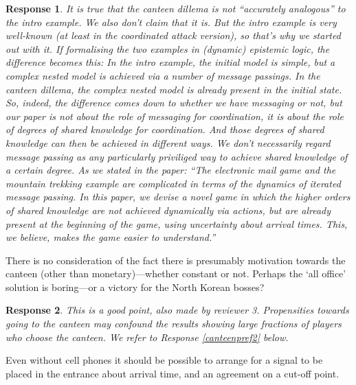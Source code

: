 \documentclass[a4paper]{article}
\newtheorem{response}{Response}
\begin{document}
\begin{response}

It is true that the canteen dillema is not ``accurately analogous'' to the intro example. We also don't claim that it is. But the intro example is very well-known (at least in the coordinated attack version), so that's why we started out with it. If formalising the two examples in (dynamic) epistemic logic, the difference becomes this: In the intro example, the initial model is simple, but a complex nested model is achieved via a number of message passings. In the canteen dillema, the complex nested model is already present in the initial state. So, indeed, the difference comes down to whether we have messaging or not, but our paper is not about the role of messaging for coordination, it is about the role of degrees of shared knowledge for coordination. And those degrees of shared knowledge can then be achieved in different ways. We don't necessarily regard message passing as any particularly priviliged way to achieve shared knowledge of a certain degree. As we stated in the paper: ``The electronic mail game and the mountain trekking example are complicated in terms of the dynamics of iterated message passing. In this paper, we devise a novel game in which the higher orders of shared knowledge are not achieved dynamically via actions, but are already present at the beginning of the game, using uncertainty about arrival times. This, we believe, makes the game easier to understand.'' 
\end{response}


There is no consideration of the fact there is presumably motivation towards the canteen (other than monetary)—whether constant or not. Perhaps the `all office' solution is boring—or a victory for the North Korean bosses? 

\begin{response} 
This is a good point, also made by reviewer 3. Propensities towards going to the canteen may confound the results showing large fractions of players who choose the canteen. We refer to Response \ref{canteenpref2} below.
\end{response}

Even without cell phones it should be possible to arrange for a signal to be placed in the entrance about arrival time, and an agreement on a cut-off point.
\end{document}
